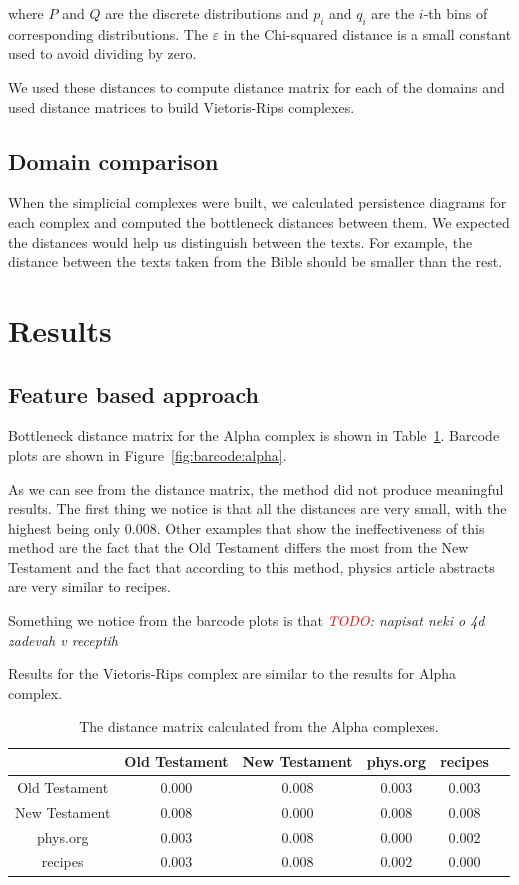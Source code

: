 \documentclass[12pt,a4paper]{amsart}
\begin{document}
\noindent
where $P$ and $Q$ are the discrete distributions and $p_i$ and $q_i$ are the
$i$-th bins of corresponding distributions. The $\varepsilon$ in the Chi-squared
distance is a small constant used to avoid dividing by zero.

We used these distances to compute distance matrix for each of the
domains and used distance matrices to build Vietoris-Rips complexes.

\subsection{Domain comparison}

When the simplicial complexes were built, we calculated persistence diagrams for
each complex and computed the bottleneck distances between them. We expected the
distances would help us distinguish between the texts. For example, the distance
between the texts taken from the Bible should be smaller than the rest.

\section{Results}

\subsection{Feature based approach} Bottleneck
distance matrix for the Alpha complex is shown in Table~\ref{tab:alpha}. 
Barcode plots are shown in Figure~\ref{fig:barcode:alpha}.

As we can see from the distance matrix, the method did not produce meaningful
results. The first thing we notice is that all the distances are very small,
with the highest being only $0.008$. Other examples that show the ineffectiveness
of this method are the fact that the Old Testament differs the most from the New
Testament and the fact that according to this method, physics article abstracts
are very similar to recipes.

Something we notice from the barcode plots is that
\emph{\textcolor{red}{TODO}: napisat neki o 4d zadevah v receptih}

Results for the Vietoris-Rips complex are similar to the results for Alpha complex.

\begin{table}
  \centering
  \begin{tabular}{c|ccccc}
                  & Old Testament & New Testament & phys.org & recipes \\ \hline
    Old Testament & $0.000$ & $0.008$ & $0.003$ & $0.003$ \\
    New Testament & $0.008$ & $0.000$ & $0.008$ & $0.008$ \\
    phys.org      & $0.003$ & $0.008$ & $0.000$ & $0.002$ \\
    recipes       & $0.003$ & $0.008$ & $0.002$ & $0.000$ \\
  \end{tabular}

  \caption{The distance matrix calculated from the Alpha complexes.}
  \label{tab:alpha}
\end{table}
\end{document}
